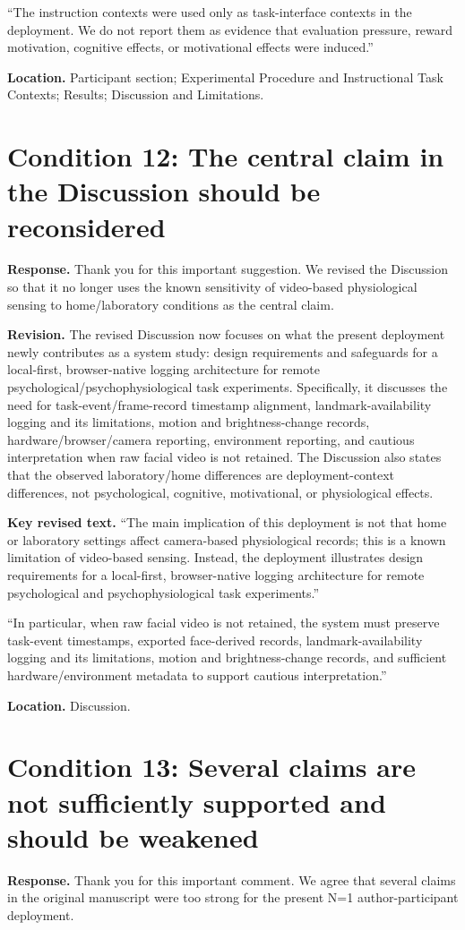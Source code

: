 \documentclass[11pt]{article}
\newcommand{\condition}[2]{\section*{Condition #1: #2}}
\begin{document}
``The instruction contexts were used only as task-interface contexts in the deployment.
We do not report them as evidence that evaluation pressure, reward motivation, cognitive effects, or motivational effects were induced.''

\textbf{Location.}
Participant section; Experimental Procedure and Instructional Task Contexts; Results; Discussion and Limitations.

\condition{12}{The central claim in the Discussion should be reconsidered}
\textbf{Response.}
Thank you for this important suggestion.
We revised the Discussion so that it no longer uses the known sensitivity of video-based physiological sensing to home/laboratory conditions as the central claim.

\textbf{Revision.}
The revised Discussion now focuses on what the present deployment newly contributes as a system study: design requirements and safeguards for a local-first, browser-native logging architecture for remote psychological/psychophysiological task experiments.
Specifically, it discusses the need for task-event/frame-record timestamp alignment, landmark-availability logging and its limitations, motion and brightness-change records, hardware/browser/camera reporting, environment reporting, and cautious interpretation when raw facial video is not retained.
The Discussion also states that the observed laboratory/home differences are deployment-context differences, not psychological, cognitive, motivational, or physiological effects.

\textbf{Key revised text.}
``The main implication of this deployment is not that home or laboratory settings affect camera-based physiological records; this is a known limitation of video-based sensing.
Instead, the deployment illustrates design requirements for a local-first, browser-native logging architecture for remote psychological and psychophysiological task experiments.''

``In particular, when raw facial video is not retained, the system must preserve task-event timestamps, exported face-derived records, landmark-availability logging and its limitations, motion and brightness-change records, and sufficient hardware/environment metadata to support cautious interpretation.''

\textbf{Location.}
Discussion.

\condition{13}{Several claims are not sufficiently supported and should be weakened}
\textbf{Response.}
Thank you for this important comment.
We agree that several claims in the original manuscript were too strong for the present N=1 author-participant deployment.
\end{document}
